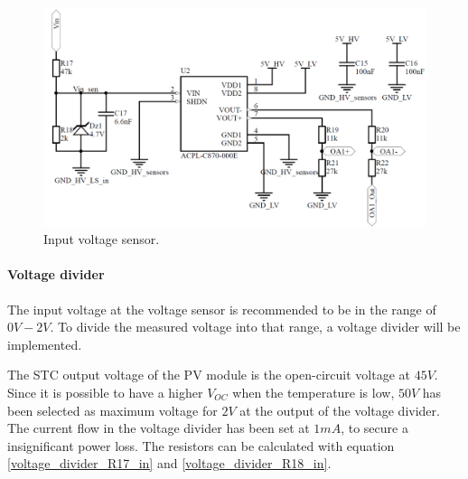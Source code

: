 \begin{figure}[H]
	\begin{center}
		\includegraphics[width=0.8\linewidth]{../Pictures/P1/Sensors/input_voltage_sensor.PNG}
		\caption{Input voltage sensor.}
		\label{fig:input_voltage_sensor_circuit}
	\end{center}
\end{figure}

\paragraph{Voltage divider}
The input voltage at the voltage sensor is recommended to be in the range of $0V-2V$. To divide the measured voltage into that range, a voltage divider will be implemented. 

The STC output voltage of the PV module is the open-circuit voltage at $45V$. Since it is possible to have a higher $V_{OC}$ when the temperature is low, $50V$ has been selected as maximum voltage for $2V$ at the output of the voltage divider. The current flow in the voltage divider has been set at $1mA$, to secure a insignificant power loss. The resistors can be calculated with equation \ref{voltage_divider_R17_in} and \ref{voltage_divider_R18_in}.


